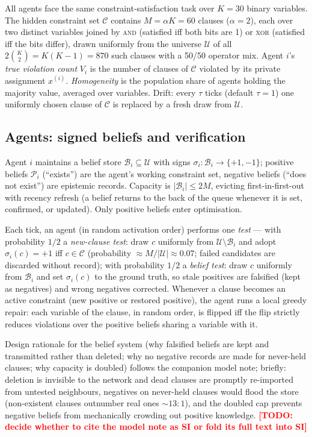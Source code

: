 \documentclass{article}
\newcommand{\todo}[1]{\textcolor{red}{\textbf{[TODO: #1]}}}
\begin{document}
All agents face the same constraint-satisfaction task over $K=30$ binary variables. The hidden constraint set $\mathcal{C}$ contains $M = \alpha K = 60$ clauses ($\alpha = 2$), each over two distinct variables joined by \textsc{and} (satisfied iff both bits are 1) or \textsc{xor} (satisfied iff the bits differ), drawn uniformly from the universe $\mathcal{U}$ of all $2\binom{K}{2} = K(K-1) = 870$ such clauses with a 50/50 operator mix. Agent $i$'s \emph{true violation count} $V_i$ is the number of clauses of $\mathcal{C}$ violated by its private assignment $x^{(i)}$. \emph{Homogeneity} is the population share of agents holding the majority value, averaged over variables. Drift: every $\tau$ ticks (default $\tau=1$) one uniformly chosen clause of $\mathcal{C}$ is replaced by a fresh draw from $\mathcal{U}$.

\subsection{Agents: signed beliefs and verification}

Agent $i$ maintains a belief store $\mathcal{B}_i \subseteq \mathcal{U}$ with signs $\sigma_i : \mathcal{B}_i \to \{+1,-1\}$; positive beliefs $\mathcal{P}_i$ (``exists'') are the agent's working constraint set, negative beliefs (``does not exist'') are epistemic records. Capacity is $|\mathcal{B}_i| \leq 2M$, evicting first-in-first-out with recency refresh (a belief returns to the back of the queue whenever it is set, confirmed, or updated). Only positive beliefs enter optimisation.

Each tick, an agent (in random activation order) performs one \emph{test} --- with probability $1/2$ a \emph{new-clause test}: draw $c$ uniformly from $\mathcal{U} \setminus \mathcal{B}_i$ and adopt $\sigma_i(c) = +1$ iff $c \in \mathcal{C}$ (probability ${\approx} M/|\mathcal{U}| \approx 0.07$; failed candidates are discarded without record); with probability $1/2$ a \emph{belief test}: draw $c$ uniformly from $\mathcal{B}_i$ and set $\sigma_i(c)$ to the ground truth, so stale positives are falsified (kept as negatives) and wrong negatives corrected. Whenever a clause becomes an active constraint (new positive or restored positive), the agent runs a local greedy repair: each variable of the clause, in random order, is flipped iff the flip strictly reduces violations over the positive beliefs sharing a variable with it.

Design rationale for the belief system (why falsified beliefs are kept and transmitted rather than deleted; why no negative records are made for never-held clauses; why capacity is doubled) follows the companion model note; briefly: deletion is invisible to the network and dead clauses are promptly re-imported from untested neighbours, negatives on never-held clauses would flood the store (non-existent clauses outnumber real ones ${\sim}13{:}1$), and the doubled cap prevents negative beliefs from mechanically crowding out positive knowledge. \todo{decide whether to cite the model note as SI or fold its full text into SI}
\end{document}
